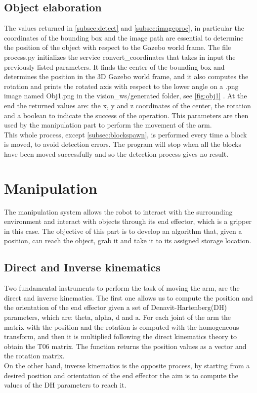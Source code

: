 \documentclass[12pt,a4paper]{article}
\begin{document}
\subsection{Object elaboration}\label{subsec:objel}
The values returned in \ref{subsec:detect} and \ref{subsec:imageproc}, in particular the coordinates of the bounding box and the image path are essential to determine the position of the object with respect to the Gazebo world frame. The file process.py initializes the service convert\_coordinates that takes in input the previously listed parameters. It finds the center of the bounding box and determines the position in the 3D Gazebo world frame, and it also computes the rotation and prints the rotated  axis with respect to the lower angle on a .png image named Obj1.png in the vision\_ws/generated folder, see \ref{fig:obj1} . At the end the returned values are: the x, y and z coordinates of the center, the rotation and a boolean to indicate the success of the operation. This parameters are then used by the manipulation part to perform the movement of the arm.\\
This whole process, except \ref{subsec:blockspawn}, is performed every time a block is moved, to avoid detection errors. The program will stop when all the blocks have been moved successfully and so the detection process gives no result.

\section{Manipulation}\label{sec:manipulation}
The manipulation system allows the robot to interact with the surrounding environment and interact with objects through its end effector, which is a gripper in this case.
The objective of this part is to develop an algorithm that, given a position, can reach the object, grab it and take it to its assigned storage location.
\subsection{Direct and Inverse kinematics}\label{subsec:kinematics}
Two fundamental instruments to perform the task of moving the arm, are the direct and inverse kinematics. The first one allows us to compute the position and the orientation of the end effector given a set of Denavit-Hartenberg(DH) parameters, which are: theta, alpha, d and a. For each joint of the arm the matrix with the position and the rotation is computed with the homogeneous transform, and then it is multiplied following the direct kinematics theory to obtain the T06 matrix. The function returns the position values as a vector and the rotation matrix.\\
On the other hand, inverse kinematics is the opposite process, by starting from a desired position and orientation of the end effector the aim is to compute the values of the DH parameters to reach it.
\end{document}
